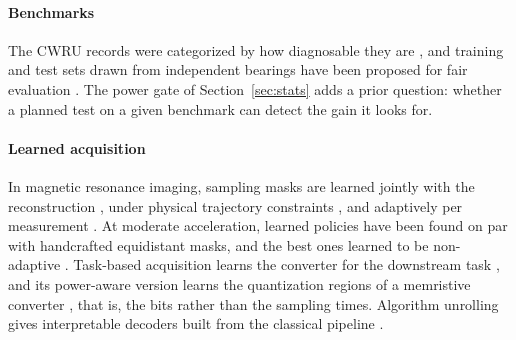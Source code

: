 \paragraph{Benchmarks}
The CWRU records were categorized by how diagnosable they are \citep{smith2015cwru}, and training
and test sets drawn from independent bearings have been proposed for fair evaluation
\citep{hendriks2022cwrubench}. The power gate of Section~\ref{sec:stats} adds a prior question:
whether a planned test on a given benchmark can detect the gain it looks for.

\paragraph{Learned acquisition}
In magnetic resonance imaging, sampling masks are learned jointly with the reconstruction
\citep{bahadir2020loupe,huijben2020dps}, under physical trajectory constraints
\citep{weiss2021pilot}, and adaptively per measurement \citep{vangorp2021adps}. At moderate
acceleration, learned policies have been found on par with handcrafted equidistant masks, and the
best ones learned to be non-adaptive \citep{bakker2022adaptive}. Task-based acquisition learns the
converter for the downstream task \citep{shlezinger2022taskadc}, and its power-aware version learns
the quantization regions of a memristive converter \citep{vol2024poweraware}, that is, the bits
rather than the sampling times. Algorithm unrolling gives interpretable decoders built from the
classical pipeline \citep{monga2021unrolling}.
